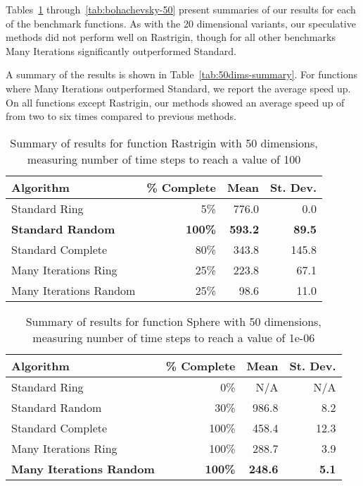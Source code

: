 \documentclass[smallcondensed]{svjour3}
\newcommand{\tabref}[1]{Table~\ref{tab:#1}}
\begin{document}
Tables~\ref{tab:rastrigin-50} through~\ref{tab:bohachevsky-50} present
summaries of our results for each of the benchmark functions. As with the 20
dimensional variants, our speculative methods did not perform well on
Rastrigin, though for all other benchmarks Many Iterations significantly
outperformed Standard.

A summary of the results is shown in \tabref{50dims-summary}.  For functions
where Many Iterations outperformed Standard, we report the average speed up.
On all functions except Rastrigin, our methods showed an average speed up of
from two to six times compared to previous methods.

\begin{table}
  \caption{Summary of results for function Rastrigin with 50 dimensions,
  measuring number of time steps to reach a value of 100}
  \label{tab:rastrigin-50}
  \centering
  \begin{tabular}{|l|r|r|r|}
  \hline
  Algorithm&\% Complete&Mean&St. Dev.\\
  \hline
  \hline
  Standard Ring&5\%&776.0&0.0\\
  \hline
  \textbf{Standard Random}&\textbf{100\%}&\textbf{593.2}&\textbf{89.5}\\
  \hline
  Standard Complete&80\%&343.8&145.8\\
  \hline
  Many Iterations Ring&25\%&223.8&67.1\\
  \hline
  Many Iterations Random&25\%&98.6&11.0\\
  \hline
  \end{tabular}
\end{table}

\begin{table}
  \caption{Summary of results for function Sphere with 50 dimensions,
  measuring number of time steps to reach a value of 1e-06}
  \label{tab:sphere-50}
  \centering
  \begin{tabular}{|l|r|r|r|}
  \hline
  Algorithm&\% Complete&Mean&St. Dev.\\
  \hline
  \hline
  Standard Ring&0\%&N/A&N/A\\
  \hline
  Standard Random&30\%&986.8&8.2\\
  \hline
  Standard Complete&100\%&458.4&12.3\\
  \hline
  Many Iterations Ring&100\%&288.7&3.9\\
  \hline
  \textbf{Many Iterations Random}&\textbf{100\%}&\textbf{248.6}&\textbf{5.1}\\
  \hline
  \end{tabular}
\end{table}
\end{document}
